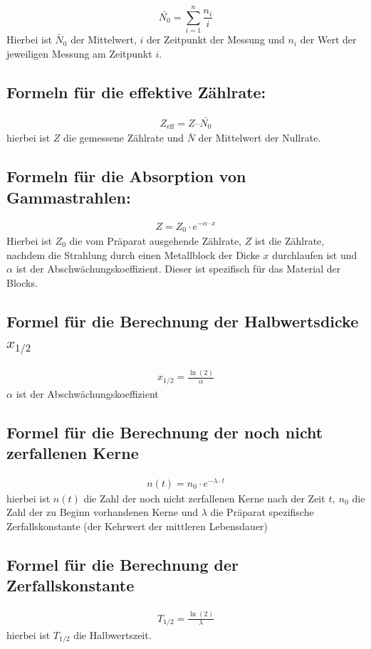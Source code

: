\documentclass[fontsize=12pt]{scrartcl}
\begin{document}
\begin{equation}
\bar{N_0}=\sum_{i=1}^n \frac{n_i}{i}
\end{equation}
\noindent
Hierbei ist $\bar{N}_0$ der Mittelwert, $i$ der Zeitpunkt der Messung und $n_i$ der Wert der jeweiligen Messung am Zeitpunkt $i$.

\subsection{Formeln für die effektive Zählrate:}
\begin{align}
Z_{\text{eff}} = Z – \bar{N_0}
\end{align}
\noindent
hierbei ist $Z$ die gemessene Zählrate und $\bar{N}$ der Mittelwert der Nullrate.

\subsection{Formeln für die Absorption von Gammastrahlen:}
\begin{align}
Z = Z_0\cdot e^{-\alpha \cdot x} 
\end{align}
\noindent
Hierbei ist $Z_0$ die vom Präparat ausgehende Zählrate, $Z$ ist die Zählrate, nachdem die Strahlung durch einen Metallblock der Dicke $x$ durchlaufen ist und $\alpha$ ist der Abschwächungskoeffizient. Dieser ist spezifisch für das Material der Blocks.

\subsection{Formel für die Berechnung der Halbwertsdicke $x_{1/2}$}
\begin{align}
x_{1/2} = \frac{\ln(2)}{\alpha}
\end{align}
\noindent
$\alpha$ ist der Abschwächungskoeffizient

\subsection{Formel für die Berechnung der noch nicht zerfallenen Kerne}
\begin{align}
n(t) = n_0\cdot e^{-\lambda \cdot t} 
\end{align}
\noindent
hierbei ist $n(t)$ die Zahl der noch nicht zerfallenen Kerne nach der Zeit $t,~n_0$ die Zahl der zu Beginn vorhandenen Kerne und $\lambda$ die Präparat spezifische Zerfallskonstante (der Kehrwert der mittleren Lebensdauer)

\subsection{Formel für die Berechnung der Zerfallskonstante}
\begin{align}
T_{1/2} = \frac{\ln(2)}{\lambda}
\end{align}
\noindent
hierbei ist $T_{1/2}$ die Halbwertszeit.
\end{document}
